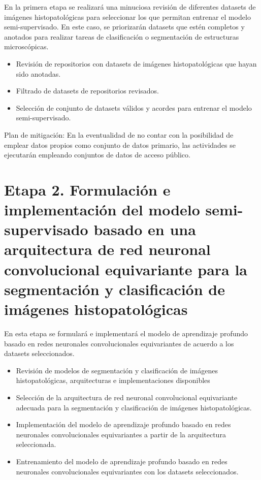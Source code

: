\documentclass[12pt,letterpaper,final, openany]{scrbook}
\begin{document}
En la primera etapa se realizará una minuciosa revisión de diferentes datasets de imágenes histopatológicas para seleccionar los que permitan entrenar el modelo semi-supervisado. En este caso, se priorizarán datasets que estén completos y anotados para realizar tareas de clasificación o segmentación de estructuras microscópicas.

\begin{itemize}
    \item Revisión de repositorios con datasets de imágenes histopatológicas que hayan sido anotadas.
    \item Filtrado de datasets de repositorios revisados.
    \item Selección de conjunto de datasets válidos y acordes para entrenar el modelo semi-supervisado.
\end{itemize}

Plan de mitigación: En la eventualidad de no contar con la posibilidad de emplear datos propios como conjunto de datos primario, las actividades se ejecutarán empleando conjuntos de datos de acceso público.

\section{Etapa 2. Formulación e implementación del modelo semi-supervisado basado en una arquitectura de red neuronal convolucional equivariante para la segmentación y clasificación de imágenes histopatológicas}

En esta etapa se formulará e implementará el modelo de aprendizaje profundo basado en redes neuronales convolucionales equivariantes de acuerdo a los datasets seleccionados.

\begin{itemize}
    \item Revisión de modelos de segmentación y clasificación de imágenes histopatológicas, arquitecturas e implementaciones disponibles
    \item Selección de la arquitectura de red neuronal convolucional equivariante adecuada para la segmentación y clasificación de imágenes histopatológicas.
    \item Implementación del modelo de aprendizaje profundo basado en redes neuronales convolucionales equivariantes a partir de la arquitectura seleccionada.
    \item Entrenamiento del modelo de aprendizaje profundo basado en redes neuronales convolucionales equivariantes con los datasets seleccionados.
\end{itemize}
\end{document}
